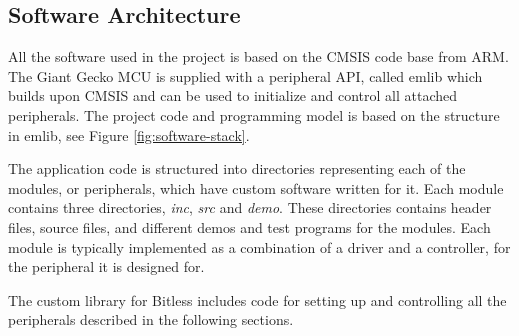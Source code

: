 \subsection{Software Architecture}

All the software used in the project is based on the CMSIS \cite{cmsisapi} code
base from ARM. The Giant Gecko MCU is supplied with a peripheral API, called
emlib \cite{emlibapi} which builds upon CMSIS and can be used to initialize and
control all attached peripherals. The project code and programming model is
based on the structure in emlib, see Figure \ref{fig:software-stack}.



The application code is structured into directories representing each of the
modules, or peripherals, which have custom software written for it. Each module
contains three directories, \textit{inc}, \textit{src} and \textit{demo}.
These directories contains header files, source files, and different demos and
test programs for the modules. Each module is typically implemented as a
combination of a driver and a controller, for the peripheral it is designed for.

The custom library for Bitless includes code for setting up and controlling
all the peripherals described in the following sections.
